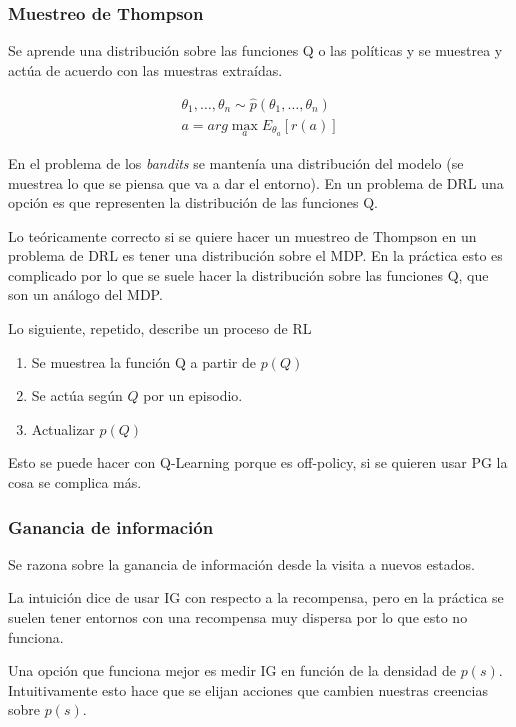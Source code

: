 
\subsubsection{Muestreo de Thompson}%
\label{ssub:muestreo_de_thompson}

Se aprende una distribución sobre las funciones Q o las políticas y se muestrea y actúa de
acuerdo con las muestras extraídas.

\begin{align}
    \theta_1, \ldots,\theta_n\sim \hat{p}(\theta_1,\ldots,\theta_n)\\
    a=arg\max_a E_{\theta_a}[r(a)]
\end{align}

En el problema de los \textit{bandits} se mantenía una distribución del modelo (se muestrea
lo que se piensa que va a dar el entorno). En un problema de DRL una opción es que representen
la distribución de las funciones Q.

Lo teóricamente correcto si se quiere hacer un muestreo de Thompson en un problema de DRL es
tener una distribución sobre el MDP. En la práctica esto es complicado por lo que se suele
hacer la distribución sobre las funciones Q, que son un análogo del MDP.

Lo siguiente, repetido, describe un proceso de RL
\begin{enumerate}
    \item Se muestrea la función Q a partir de $p(Q)$
    \item Se actúa según $Q$ por un episodio.
    \item Actualizar $p(Q)$
\end{enumerate}
Esto se puede hacer con Q-Learning porque es off-policy, si se quieren usar PG la cosa se
complica más.

\subsubsection{Ganancia de información}%
\label{ssub:ganancia_de_información}

Se razona sobre la ganancia de información desde la visita a nuevos estados.

La intuición dice de usar IG con respecto a la recompensa, pero en la práctica se suelen
tener entornos con una recompensa muy dispersa por lo que esto no funciona.

Una opción que funciona mejor es medir IG en función de la densidad de $p(s)$.
Intuitivamente esto hace que se elijan acciones que cambien nuestras creencias sobre
$p(s)$.

